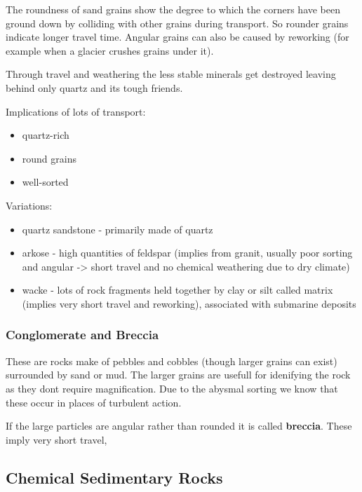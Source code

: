 \documentclass{article}
\begin{document}
The roundness of sand grains show the degree to which the corners have been ground down by colliding with other grains during transport. So rounder grains indicate longer travel time. Angular grains can also be caused by reworking (for example when a glacier crushes grains under it).

Through travel and weathering the less stable minerals get destroyed leaving behind only quartz and its tough friends.

Implications of lots of transport:
\begin{itemize}
    \item quartz-rich
    \item round grains
    \item well-sorted
\end{itemize}

Variations:
\begin{itemize}
    \item quartz sandstone - primarily made of quartz
    \item arkose - high quantities of feldspar (implies from granit, usually poor sorting and angular -> short travel and no chemical weathering due to dry climate)
    \item wacke - lots of rock fragments held together by clay or silt called matrix (implies very short travel and reworking), associated with submarine deposits
\end{itemize}

\subsubsection*{Conglomerate and Breccia} %
\label{sub:conglomerate_and_breccia}
These are rocks make of pebbles and cobbles (though larger grains can exist) surrounded by sand or mud. The larger grains are usefull for idenifying the rock as they dont require magnification. Due to the abysmal sorting we know that these occur in places of turbulent action.

If the large particles are angular rather than rounded it is called \textbf{breccia}. These imply very short travel,

\subsection*{Chemical Sedimentary Rocks} %
\label{sub:chemical_sedimentary_rocks}
\end{document}
